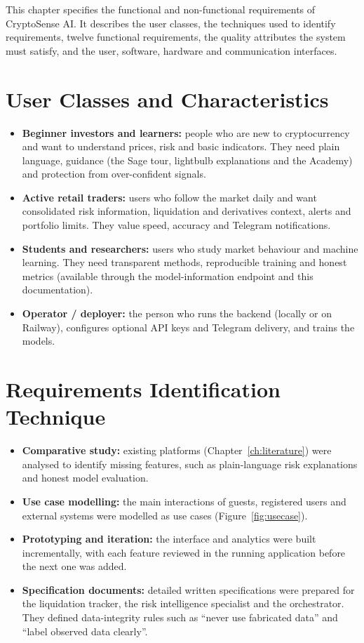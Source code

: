 
\chapteroverview
This chapter specifies the functional and non-functional requirements of CryptoSense AI. It describes the user classes, the techniques used to identify requirements, twelve functional requirements, the quality attributes the system must satisfy, and the user, software, hardware and communication interfaces.

\section{User Classes and Characteristics}
\begin{itemize}
\item \textbf{Beginner investors and learners:} people who are new to cryptocurrency and want to understand prices, risk and basic indicators. They need plain language, guidance (the Sage tour, lightbulb explanations and the Academy) and protection from over-confident signals.
\item \textbf{Active retail traders:} users who follow the market daily and want consolidated risk information, liquidation and derivatives context, alerts and portfolio limits. They value speed, accuracy and Telegram notifications.
\item \textbf{Students and researchers:} users who study market behaviour and machine learning. They need transparent methods, reproducible training and honest metrics (available through the model-information endpoint and this documentation).
\item \textbf{Operator / deployer:} the person who runs the backend (locally or on Railway), configures optional API keys and Telegram delivery, and trains the models.
\end{itemize}

\section{Requirements Identification Technique}
\begin{itemize}
\item \textbf{Comparative study:} existing platforms (Chapter~\ref{ch:literature}) were analysed to identify missing features, such as plain-language risk explanations and honest model evaluation.
\item \textbf{Use case modelling:} the main interactions of guests, registered users and external systems were modelled as use cases (Figure~\ref{fig:usecase}).
\item \textbf{Prototyping and iteration:} the interface and analytics were built incrementally, with each feature reviewed in the running application before the next one was added.
\item \textbf{Specification documents:} detailed written specifications were prepared for the liquidation tracker, the risk intelligence specialist and the orchestrator. They defined data-integrity rules such as ``never use fabricated data'' and ``label observed data clearly''.
\end{itemize}


